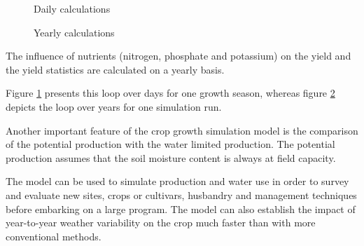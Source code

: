 \begin{figure}[htbp]
\caption{Daily calculations}
\label{fig:dayloop}
 \begin{center} \end{center}
\end{figure}

\begin{figure}[htbp]
\caption{Yearly calculations}
\label{fig:yearloop}
 \begin{center} \end{center}
\end{figure}

The influence of nutrients (nitrogen, phosphate and potassium) on the yield and the
yield statistics are calculated on a yearly basis. 

Figure \ref{fig:dayloop} presents this loop over days for one growth season, 
whereas figure \ref{fig:yearloop} depicts the loop over years for one simulation run.

Another important feature of the crop growth simulation model is the comparison of
the potential production with the water limited production. The potential production
assumes that the soil moisture content is always at field capacity.

\begin{figure}[htbp]
\end{figure}

\begin{figure}[htbp]
 \begin{center} \end{center}
\end{figure}

\begin{figure}[htbp]
 \begin{center} \end{center}
\end{figure}

The model can be used to simulate pro\-duction and water use in order to survey
and evaluate new sites, crops or cultivars, husbandry and management techniques 
before embarking on a large
program. The model can also establish the impact of year-to-year weather variability
on the crop much faster than with more conventional methods. 

